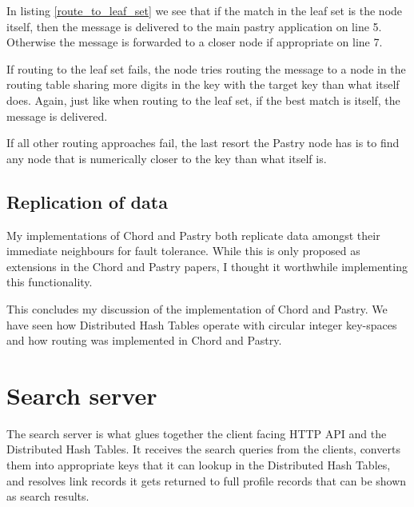 In listing \ref{route_to_leaf_set} we see that if the match in the leaf set is the node itself, then the message is delivered to the main pastry application on line 5. Otherwise the message is forwarded to a closer node if appropriate on line 7.



If routing to the leaf set fails, the node tries routing the message to a node in the routing table sharing more digits in the key with the target key than what itself does. Again, just like when routing to the leaf set, if the best match is itself, the message is delivered.



If all other routing approaches fail, the last resort the Pastry node has is to find any node that is numerically closer to the key than what itself is.



\subsection{Replication of data}
My implementations of Chord and Pastry both replicate data amongst their immediate neighbours for fault tolerance. While this is only proposed as extensions in the Chord and Pastry papers, I thought it worthwhile implementing this functionality.

\mbox{}

This concludes my discussion of the implementation of Chord and Pastry. We have seen how Distributed Hash Tables operate with circular integer key-spaces and how routing was implemented in Chord and Pastry.

\section{Search server}
The search server is what glues together the client facing HTTP API and the Distributed Hash Tables. It receives the search queries from the clients, converts them into appropriate keys that it can lookup in the Distributed Hash Tables, and resolves link records it gets returned to full profile records that can be shown as search results.

